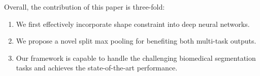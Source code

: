 Overall, the contribution of this paper is three-fold:
\begin{enumerate}
	\item We first effectively incorporate shape constraint into deep neural networks.
	\item We propose a novel split max pooling for benefiting both multi-task outputs.
	\item Our framework is capable to handle the challenging biomedical segmentation tasks and achieves the state-of-the-art performance.
\end{enumerate}

